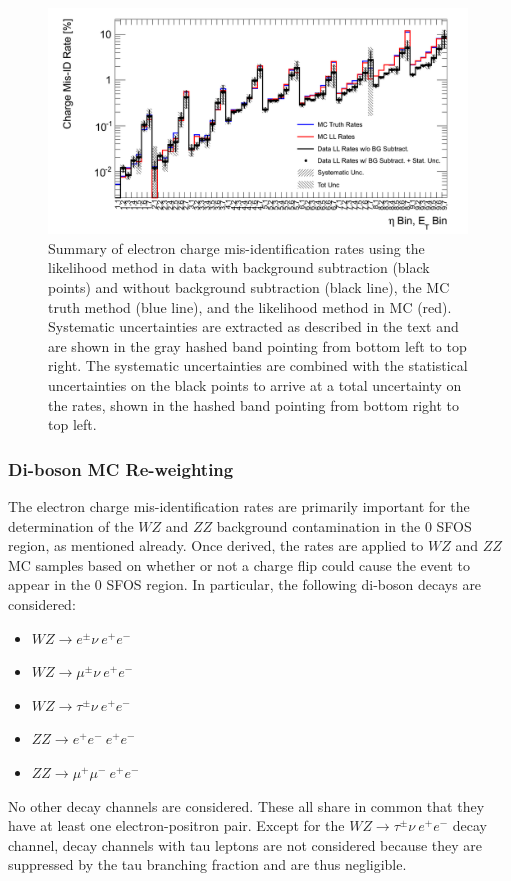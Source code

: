 \begin{figure}[htp]
\centering
\includegraphics[width=0.99\textwidth]{figures/ChargeMisID/Validation_ChargeMisIDRates_PTvsEta_FinalRateWithSys.png}
\caption{Summary of electron charge mis-identification rates using
the likelihood method in data with background subtraction (black points) 
and without background subtraction (black line), the MC truth 
method (blue line), and the likelihood method in MC (red).
Systematic uncertainties are extracted as described in the text and are shown
in the gray hashed band pointing from bottom left to top right. 
The systematic uncertainties are combined with the statistical uncertainties
on the black points to arrive at a total uncertainty on the rates, shown 
in the hashed band pointing from bottom right to top left.}
\label{fig:ChargeMisID_truthRate_finalFig}
\end{figure}




\subsubsection{Di-boson MC Re-weighting}


The electron charge mis-identification  rates are primarily important for the determination of the $WZ$ and $ZZ$ background contamination in the 0 SFOS region,
as mentioned already.
Once derived, the rates are applied to $WZ$ and $ZZ$ MC samples based on 
whether or not a charge flip could cause the event to appear in the 0 SFOS region.  
In particular, the following di-boson decays are considered:
\begin{itemize}
\item $WZ\rightarrow e^{\pm}\nu~ e^{+}e^{-}$
\item $WZ\rightarrow \mu^{\pm}\nu~ e^{+}e^{-}$
\item $WZ\rightarrow \tau^{\pm}\nu~ e^{+}e^{-}$
\item $ZZ\rightarrow e^{+}e^{-}~e^{+}e^{-}$
\item $ZZ\rightarrow \mu^{+}\mu^{-}~ e^{+}e^{-}$
\end{itemize}
No other decay channels are considered.  These all share in common that they 
have at least one electron-positron pair.  
Except for the $WZ\rightarrow \tau^{\pm}\nu~e^{+}e^{-}$ decay channel, 
decay channels with tau leptons are not considered
because they are suppressed by the tau branching fraction and are 
thus negligible.

